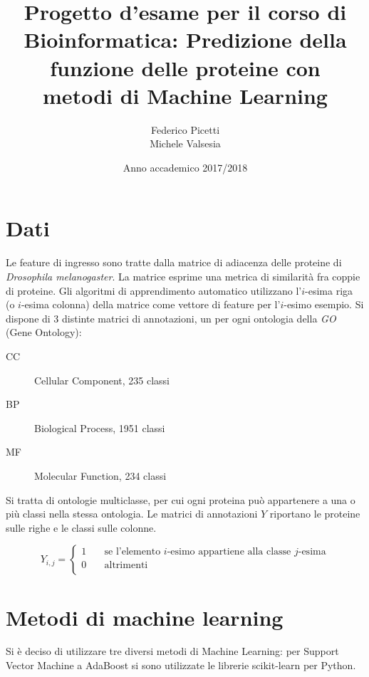 \documentclass[12pt,a4paper,oneside,hidelinks]{report}
\begin{document}

\title{%
  	   Progetto d’esame per il corso di Bioinformatica: 
	   Predizione della funzione delle proteine con \\
       metodi di Machine Learning}
  
\author{Federico Picetti \\
        Michele Valsesia}

\date{Anno accademico 2017/2018} 

\maketitle

\tableofcontents



\chapter{Dati}
Le feature di ingresso sono tratte dalla matrice di adiacenza delle proteine di \emph{Drosophila melanogaster}. La matrice esprime una metrica di similarità fra coppie di proteine.
Gli algoritmi di apprendimento automatico utilizzano l'$ i $-esima riga (o $ i $-esima colonna) della matrice come vettore di feature per l'$ i $-esimo esempio.
Si dispone di 3 distinte matrici di annotazioni, un per ogni ontologia della \emph{GO} (Gene Ontology):
\begin{description}
\item[CC]Cellular Component, 235 classi
\item[BP]Biological Process, 1951 classi
\item[MF]Molecular Function, 234 classi
\end{description}
Si tratta di ontologie multiclasse, per cui ogni proteina può appartenere a una o più classi nella stessa ontologia.
Le matrici di annotazioni $ Y $ riportano le proteine sulle righe e le classi sulle colonne. 

\[ Y_{i,j} =
  \begin{cases}
    1       & \quad \text{se l'elemento } i \text{-esimo appartiene alla classe } j \text{-esima}\\
    0  & \quad \text{altrimenti}\\
  \end{cases}
\]




\chapter{Metodi di machine learning}
Si è deciso di utilizzare tre diversi metodi di Machine Learning: per Support Vector Machine a AdaBoost si sono utilizzate le librerie scikit-learn per Python.
\end{document}
